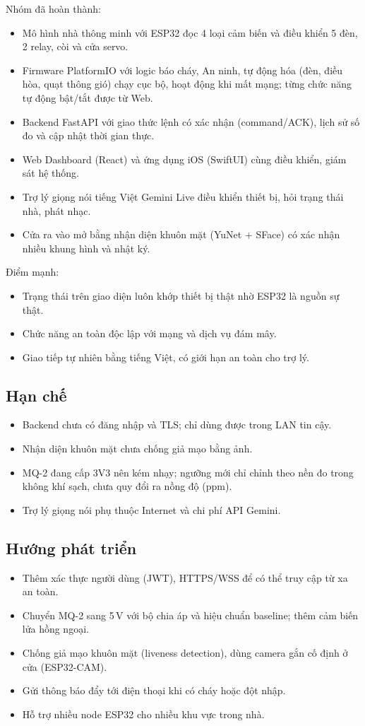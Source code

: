 \documentclass[12pt,a4paper]{extarticle}
\begin{document}
Nhóm đã hoàn thành:
\begin{itemize}
  \item Mô hình nhà thông minh với ESP32 đọc 4 loại cảm biến và điều khiển 5 đèn, 2 relay, còi và cửa servo.
  \item Firmware PlatformIO với logic báo cháy, An ninh, tự động hóa (đèn, điều hòa, quạt thông gió) chạy cục bộ, hoạt động khi mất mạng; từng chức năng tự động bật/tắt được từ Web.
  \item Backend FastAPI với giao thức lệnh có xác nhận (command/ACK), lịch sử số đo và cập nhật thời gian thực.
  \item Web Dashboard (React) và ứng dụng iOS (SwiftUI) cùng điều khiển, giám sát hệ thống.
  \item Trợ lý giọng nói tiếng Việt Gemini Live điều khiển thiết bị, hỏi trạng thái nhà, phát nhạc.
  \item Cửa ra vào mở bằng nhận diện khuôn mặt (YuNet + SFace) có xác nhận nhiều khung hình và nhật ký.
\end{itemize}
Điểm mạnh:
\begin{itemize}
  \item Trạng thái trên giao diện luôn khớp thiết bị thật nhờ ESP32 là nguồn sự thật.
  \item Chức năng an toàn độc lập với mạng và dịch vụ đám mây.
  \item Giao tiếp tự nhiên bằng tiếng Việt, có giới hạn an toàn cho trợ lý.
\end{itemize}

\subsection{Hạn chế}
\begin{itemize}
  \item Backend chưa có đăng nhập và TLS; chỉ dùng được trong LAN tin cậy.
  \item Nhận diện khuôn mặt chưa chống giả mạo bằng ảnh.
  \item MQ-2 đang cấp 3V3 nên kém nhạy; ngưỡng mới chỉ chỉnh theo nền đo trong không khí sạch, chưa quy đổi ra nồng độ (ppm).
  \item Trợ lý giọng nói phụ thuộc Internet và chi phí API Gemini.
\end{itemize}

\subsection{Hướng phát triển}
\begin{itemize}
  \item Thêm xác thực người dùng (JWT), HTTPS/WSS để có thể truy cập từ xa an toàn.
  \item Chuyển MQ-2 sang 5\,V với bộ chia áp và hiệu chuẩn baseline; thêm cảm biến lửa hồng ngoại.
  \item Chống giả mạo khuôn mặt (liveness detection), dùng camera gắn cố định ở cửa (ESP32-CAM).
  \item Gửi thông báo đẩy tới điện thoại khi có cháy hoặc đột nhập.
  \item Hỗ trợ nhiều node ESP32 cho nhiều khu vực trong nhà.
\end{itemize}
\end{document}
